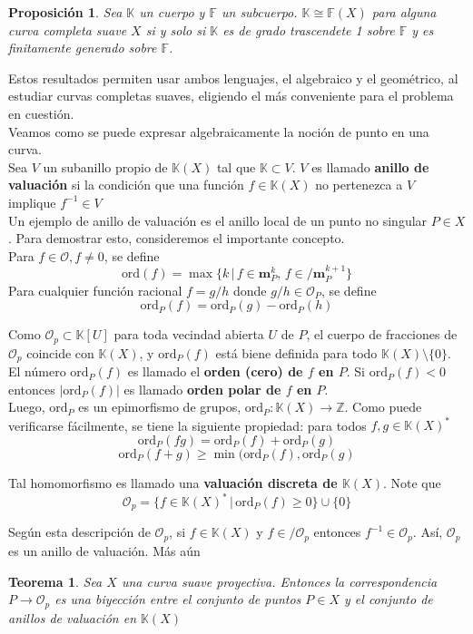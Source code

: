 \documentclass[12pt,a4paper]{report}
\newcommand{\noin}{\in \!\!\!\!\! / }
\newcommand{\msp}{\mathbf{m}_{P}}
\newcommand{\Ou}{\mathscr{O}}
\newcommand{\Op}{\mathscr{O}_{p}}
\newcommand{\K}{\mathbb{K}}
\newcommand{\ordp}{\mbox{ord}_{P}}
\newcommand{\ord}{\mbox{ord}}
\newtheorem{teo}{Teorema}[chapter]
\newtheorem{prop}{Proposición}[chapter]
\begin{document}
\begin{prop}
	Sea $\K$ un cuerpo y $\mathbb{F}$ un subcuerpo. $ \K \cong\mathbb{F}(X)  $ para alguna curva completa suave $X$ si y solo si $\K$ es de grado trascendete 1 sobre $\mathbb{F}$ y es finitamente generado sobre $\mathbb{F}$. 
\end{prop}

Estos resultados permiten usar ambos lenguajes, el algebraico y el geométrico, al estudiar curvas completas suaves, eligiendo el más conveniente para el problema en cuestión.\\

Veamos como se puede expresar algebraicamente la noción de punto en una curva.\\
Sea $V $ un subanillo propio de $\K (X)$ tal que $\K \subset V$. $V$ es llamado \textbf{anillo de valuación} si la condición que una función $f \in \K (X)$ no pertenezca a $V$ implique $f^{-1}\in V$\\
Un ejemplo de anillo de valuación es el anillo local de un punto no singular $P \in X$. Para demostrar esto, consideremos el importante concepto. \\

Para $f \in \Ou , f \neq 0$, se define $$ \ord (f) = \max \{ k \, | \, f \in \msp^{k}, \, f \noin \msp ^{k+1} \} $$ Para cualquier función racional $f = g/h$ donde $g /h \in \Ou _{P}$, se define $$ \ordp(f)= \ordp (g)- \ordp(h) $$

Como $\Op \subset \K[U]$ para toda vecindad abierta $U$ de $P$, el cuerpo de fracciones de $\Op$ coincide con $\K(X)$, y $\ordp(f)$ está biene definida para todo $\K(X)\setminus \{0\}$. El número $\ordp(f)$ es llamado el \textbf{orden (cero) de $f$ en $P$}. Si $\ordp (f) <0 $ entonces $|\ordp (f)| $ es llamado \textbf{orden polar de $f$ en $P$}. \\
Luego, $\ordp $ es un epimorfismo de grupos, $\ordp:  \K(X) \rightarrow \mathbb{Z}$. Como puede verificarse fácilmente, se tiene la siguiente propiedad: para todos $f, g \in \K(X)^{*}$
$$\ordp (fg)= \ordp (f) + \ordp (g)$$ $$\ordp (f+g) \geq \min (\ordp (f),\ordp (g) $$

Tal homomorfismo es llamado una \textbf{valuación discreta de $\K(X)$}. Note que $$ \Op = \{ f \in \K(X)^{*}  \, | \, \ordp (f) \geq 0  \} \cup \{0\} $$

Según esta descripción de $\Op$, si $f\in \K(X)$ y $f \noin \Op$ entonces $f^{-1} \in \Op$. Así, $\Op$ es un anillo de valuación. Más aún

\begin{teo}\label{2.1.50}
	Sea $X$ una curva suave proyectiva. Entonces la correspondencia $P \rightarrow \Op$ es una biyección entre el conjunto de puntos $P \in X$ y el conjunto de anillos de valuación en $\K(X)$
\end{teo}
\end{document}
